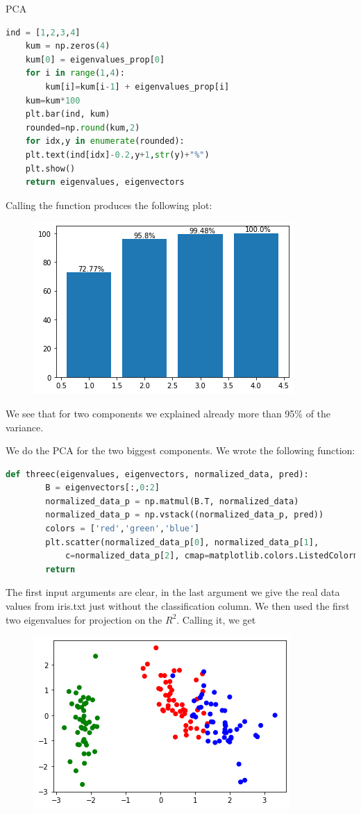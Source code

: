 \begin{task}[]{PCA}
\begin{subtask}
\begin{lstlisting}[language=python]
	ind = [1,2,3,4]
	kum = np.zeros(4)
	kum[0] = eigenvalues_prop[0]
	for i in range(1,4):
		kum[i]=kum[i-1] + eigenvalues_prop[i]  
	kum=kum*100
	plt.bar(ind, kum)
	rounded=np.round(kum,2)
	for idx,y in enumerate(rounded):
	plt.text(ind[idx]-0.2,y+1,str(y)+"%")
	plt.show()    
	return eigenvalues, eigenvectors
\end{lstlisting}
Calling the function produces the following plot:
\begin{figure}[H]
	\includegraphics[]{bar}
\end{figure}
We see that for two components we explained already more than 95\% of the variance.
\end{subtask}
\begin{subtask}
	We do the PCA for the two biggest components. We wrote the following function:
\begin{lstlisting}[language=python]
	def threec(eigenvalues, eigenvectors, normalized_data, pred):
		B = eigenvectors[:,0:2]
		normalized_data_p = np.matmul(B.T, normalized_data)
		normalized_data_p = np.vstack((normalized_data_p, pred))
		colors = ['red','green','blue']
		plt.scatter(normalized_data_p[0], normalized_data_p[1], 
			c=normalized_data_p[2], cmap=matplotlib.colors.ListedColormap(colors))
		return
\end{lstlisting}
The first input arguments are clear, in the last argument we give the real data values from iris.txt just without the classification column. We then used the first two eigenvalues for projection on the $R^2$. Calling it, we get
\begin{figure}[H]
		\includegraphics[]{2dprojectionPCA}

\end{figure}
\end{subtask}
\end{task}
